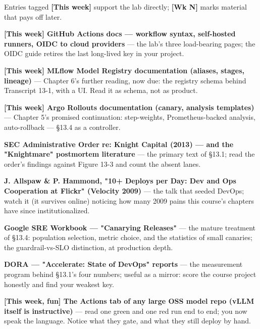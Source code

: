 
Entries tagged \textbf{[This week]} support the lab directly; \textbf{[Wk N]} marks material that pays off later.

\begin{tbbitemize}
  \item \textbf{[This week] GitHub Actions docs — workflow syntax, self-hosted runners, OIDC to cloud providers} — the lab's three load-bearing pages; the OIDC guide retires the last long-lived key in your project.
  \item \textbf{[This week] MLflow Model Registry documentation (aliases, stages, lineage)} — Chapter 6's further reading, now due: the registry schema behind Transcript 13-1, with a UI. Read it as schema, not as product.
  \item \textbf{[This week] Argo Rollouts documentation (canary, analysis templates)} — Chapter 5's promised continuation: step-weights, Prometheus-backed analysis, auto-rollback — §13.4 as a controller.
  \item \textbf{SEC Administrative Order re: Knight Capital (2013) — and the "Knightmare" postmortem literature} — the primary text of §13.1; read the order's findings against Figure 13-3 and count the absent lanes.
  \item \textbf{J. Allspaw \& P. Hammond, "10+ Deploys per Day: Dev and Ops Cooperation at Flickr" (Velocity 2009)} — the talk that seeded DevOps; watch it (it survives online) noticing how many 2009 pains this course's chapters have since institutionalized.
  \item \textbf{Google SRE Workbook — "Canarying Releases"} — the mature treatment of §13.4: population selection, metric choice, and the statistics of small canaries; the guardrail-vs-SLO distinction, at production depth.
  \item \textbf{DORA — "Accelerate: State of DevOps" reports} — the measurement program behind §13.1's four numbers; useful as a mirror: score the course project honestly and find your weakest key.
  \item \textbf{[This week, fun] The Actions tab of any large OSS model repo (vLLM itself is instructive)} — read one green and one red run end to end; you now speak the language. Notice what they gate, and what they still deploy by hand.
\end{tbbitemize}

\vspace{5.0pt}

